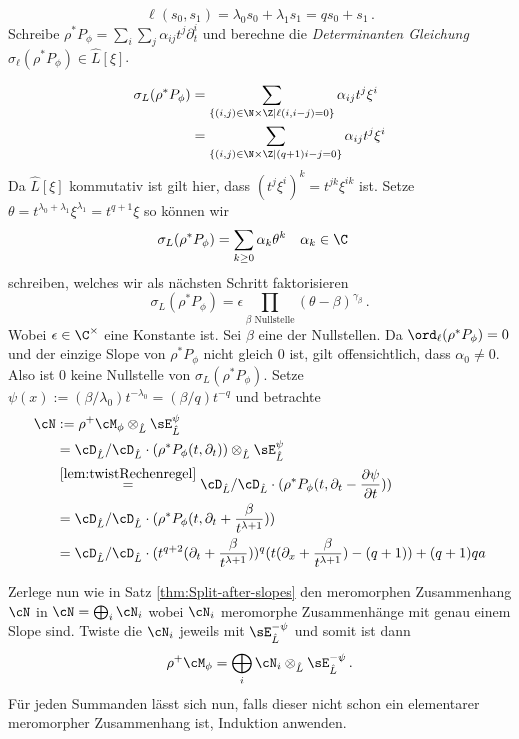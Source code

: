 \[
\ell(s_0,s_1)=\lambda_0s_0+\lambda_1s_1=qs_0+s_1 \,.
\]
Schreibe $\rho^*P_{\phi}=\sum_i\sum_j\alpha_{ij}t^j\partial_t^i$ und berechne
die \emph{Determinanten Gleichung} $\sigma_\ell(\rho^*P_{\phi})\in \hat L[\xi]$.
\begin{comment}
Schon gezeigt, das $ord_\ell = 0$?
\end{comment}
\begin{align*}
\sigma_L(\rho^*P_{\phi})
  &= \sum_{\{(i,j)\in\N\times\Z \mid \ell(i,i-j)=0\}}\alpha_{ij}t^j\xi^i\\
  &= \sum_{\{(i,j)\in\N\times\Z \mid (q+1)i-j=0\}}\alpha_{ij}t^j\xi^i
\end{align*}
Da $\hat L[\xi]$ kommutativ ist gilt hier, dass $(t^j\xi^i)^k=t^{jk}\xi^{ik}$ ist.
Setze $\theta=t^{\lambda_0+\lambda_1}\xi^{\lambda_1}=t^{q+1}\xi$ so können wir
\begin{align*}
\sigma_L(\rho^*P_{\phi}) &= \sum_{k\geq 0}\alpha_k\theta^k & & \alpha_k\in\C
\end{align*}
schreiben, welches wir als nächsten Schritt faktorisieren
\[
\sigma_L(\rho^*P_\phi)
  =\epsilon\prod_{\beta\mbox{ Nullstelle}}(\theta-\beta)^{\gamma_\beta}\,.
\]
Wobei $\epsilon\in\C^\times$ eine Konstante ist.
Sei $\beta$  eine der Nullstellen.
Da $\ord_\ell(\rho^*P_\phi)=0$ und der einzige Slope von $\rho^*P_\phi$ nicht
gleich $0$ ist, gilt offensichtlich, dass $\alpha_0\neq0$. Also ist $0$ keine
Nullstelle von $\sigma_L(\rho^*P_\phi)$.
Setze $\psi(x):=(\beta/\lambda_0)t^{-\lambda_0}=(\beta/q)t^{-q}$ und
betrachte
\begin{align*}
\cN&:=\rho^+\cM_\phi\otimes_{\hat L}\sE_{\hat L}^\psi
\\&= \cD_{\hat L}/\cD_{\hat L}\cdot(\rho^*P_{\phi}(t,\partial_t))
    \otimes_{\hat L}\sE_{\hat L}^\psi
\\&\overset{\ref{lem:twistRechenregel}}{=}
  \cD_{\hat L}/\cD_{\hat L}\cdot(\rho^*P_{\phi}(t,\partial_t-\frac{\partial
  \psi}{\partial t}))
\\&=\cD_{\hat L}/\cD_{\hat
    L}\cdot(\rho^*P_{\phi}(t,\partial_t+\frac{\beta}{t^{\lambda+1}}))
\\&=\cD_{\hat L}/\cD_{\hat L}\cdot
    (t^{q+2}(\partial_t+\frac{\beta}{t^{\lambda+1}}))^{q}
    (t(\partial_x+\frac{\beta}{t^{\lambda+1}})-(q+1))+(q+1)qa
\end{align*}
\begin{comment}
TODO: hier weiter vereinfachen
\end{comment}
Zerlege nun wie in  Satz \ref{thm:Split-after-slopes} den meromorphen
Zusammenhang $\cN$ in $\cN=\bigoplus_i\cN_i$ wobei $\cN_i$ meromorphe
Zusammenhänge mit genau einem Slope sind.
Twiste die $\cN_i$ jeweils mit $\sE^{-\psi}_{\hat L}$ und somit ist dann
\[
\rho^+\cM_{\phi}=\bigoplus_i\cN_i\otimes_{\hat L}\sE^{-\psi}_{\hat L} \,.
\]
Für jeden Summanden lässt sich nun, falls dieser nicht schon ein elementarer
meromorpher Zusammenhang ist, Induktion anwenden.
\begin{comment}
nicht elementar, sondern regulär otimes E
\end{comment}

